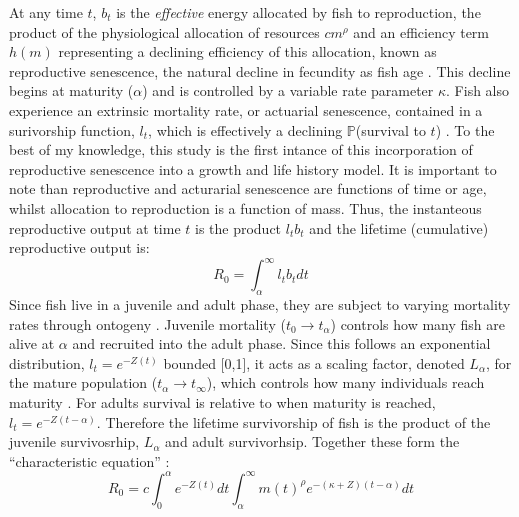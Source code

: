 \documentclass[a4paper]{article} %
\begin{document}
At any time $t$, $b_{t}$ is the \textit{effective} energy allocated by fish to reproduction, the product of the physiological allocation of resources $cm^{\rho}$ and an efficiency term $h(m)$ representing a declining efficiency of this allocation, known as reproductive senescence, the natural decline in fecundity as fish age \autocite{Stearns2000, Benoit2018, Vrtilek2018}. This decline begins at maturity ($\alpha$) and is controlled by a variable rate parameter $\kappa$. Fish also experience an extrinsic mortality rate, or actuarial senescence, contained in a surivorship function, $l_t$, which is effectively a declining $\mathbb{P}$(survival to $t$) \autocite{Beverton1959, Peterson1984, Charnov1993,Walters1993, Charnov2001, Benoit2018, Laird2010, Reznick2002, Reznick2006}. To the best of my knowledge, this study is the first intance of this incorporation of reproductive senescence into a growth and life history model. It is important to note than reproductive and acturarial senescence are functions of time or age, whilst allocation to reproduction is a function of mass. Thus, the instanteous reproductive output at time $t$ is the product $l_{t}b_{t}$ and the lifetime (cumulative) reproductive output is:
\begin{equation}
    R_{0} = \int_{\alpha}^{\infty}l_{t}b_{t} dt
\end{equation}
Since fish live in a juvenile and adult phase, they are subject to varying mortality rates through ontogeny \autocite{Charnov2001}. Juvenile mortality ($t_0 \rightarrow t_{\alpha}$) controls how many fish are alive at $\alpha$ and recruited into the adult phase. Since this follows an exponential distribution, $l_t = e^{-Z(t)}$ bounded [0,1], it acts as a scaling factor, denoted $L_{\alpha}$, for the mature population ($t_{\alpha} \rightarrow t_{\infty}$), which controls how many individuals reach maturity \autocite{Charnov1990-agematurity}. For adults survival is relative to when maturity is reached, $l_{t} = e^{-Z(t-\alpha)}$. Therefore the lifetime survivorship of fish is the product of the juvenile survivosrhip, $L_{\alpha}$ and adult survivorhsip. Together these form the ``characteristic equation'' \autocite{roff1992evolution, roff2002life, stearns1992evolution, Arendt2011, Tsoukali2016}:
\begin{equation}
    R_{0} = c\int_{0}^{\alpha}e^{-Z(t)}dt\int_{\alpha}^{\infty} m(t)^{\rho} e^{-(\kappa+Z)(t-\alpha)} dt \label{LHT_optimisation}
\end{equation}
\end{document}
